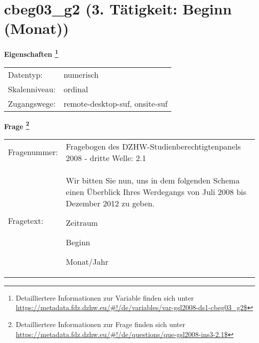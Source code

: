 
    \setcounter{footnote}{0}

    \vspace*{-1.8cm}
	\section{cbeg03\_g2 (3. Tätigkeit: Beginn (Monat))}
	\label{section:cbeg03_g2}



    \vspace*{0.5cm}
    \noindent\textbf{Eigenschaften
	\footnote{Detailliertere Informationen zur Variable finden sich unter
		\url{https://metadata.fdz.dzhw.eu/\#!/de/variables/var-gsl2008-ds1-cbeg03_g2$}}}\\
	\begin{tabularx}{\hsize}{@{}lX}
	Datentyp: & numerisch \\
	Skalenniveau: & ordinal \\
	Zugangswege: &
	  remote-desktop-suf, 
	  onsite-suf
 \\
    \end{tabularx}



				\vspace*{0.5cm}
                \noindent\textbf{Frage
	                \footnote{Detailliertere Informationen zur Frage finden sich unter
		              \url{https://metadata.fdz.dzhw.eu/\#!/de/questions/que-gsl2008-ins3-2.1$}}}\\
				\begin{tabularx}{\hsize}{@{}lX}
					Fragenummer: &
					  Fragebogen des DZHW-Studienberechtigtenpanels 2008 - dritte Welle:
					  2.1
 \\
					Fragetext: & Wir bitten Sie nun, uns in dem folgenden Schema einen Überblick Ihres Werdegangs von Juli 2008 bis Dezember 2012 zu geben.\par  Zeitraum\par  Beginn\par  Monat/Jahr \\
				\end{tabularx}





